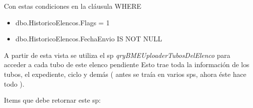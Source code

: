 \documentclass[]{article}
\begin{document}
\par Con estas condiciones en la cláusula WHERE

\begin{itemize}[label=\textcolor{blue}{\textbullet}]
	\item dbo.HistoricoElencos.Flags = 1
	\item dbo.HistoricoElencos.FechaEnvio IS NOT NULL
\end{itemize}

\par A partir de esta vista se utiliza el  sp \emph{qryBMEUploaderTubosDelElenco} para acceder a cada tubo de este elenco pendiente
Esto trae toda la información de los tubos, el expediente, ciclo y demás ( antes se traía en varios sps, ahora éste hace todo ).


\par Items que debe retornar este sp:
\end{document}
